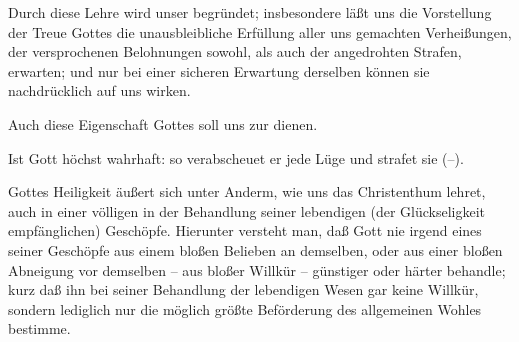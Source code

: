 \begin{aufza}
\item Durch diese Lehre wird unser  begründet; insbesondere läßt uns die Vorstellung der Treue Gottes die unausbleibliche Erfüllung aller uns gemachten Verheißungen, der versprochenen Belohnungen sowohl, als auch der angedrohten Strafen, erwarten; und nur bei einer sicheren Erwartung derselben können sie nachdrücklich auf uns wirken.
\item Auch diese Eigenschaft Gottes soll uns zur  dienen.
\item Ist Gott höchst wahrhaft: so verabscheuet er jede Lüge und strafet sie (--).
\end{aufza}

Gottes Heiligkeit äußert sich unter Anderm, wie uns das Christenthum lehret, auch in einer völligen  in der Behandlung seiner lebendigen (der Glückseligkeit empfänglichen) Geschöpfe. Hierunter versteht man, daß Gott nie irgend eines seiner Geschöpfe aus einem bloßen Belieben an demselben, oder aus einer bloßen Abneigung vor demselben -- aus bloßer Willkür -- günstiger oder härter behandle; kurz daß ihn bei seiner Behandlung der lebendigen Wesen gar keine Willkür, sondern lediglich nur die möglich größte Beförderung des allgemeinen Wohles bestimme.

